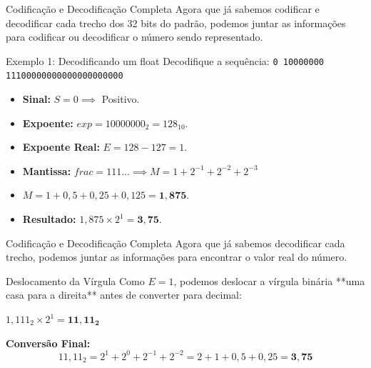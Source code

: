 \begin{frame}{Codificação e Decodificação Completa}
    Agora que já sabemos codificar e decodificar cada trecho dos 32 bits do padrão, podemos juntar as informações para codificar ou decodificar o número sendo representado.

    \begin{exampleblock}{Exemplo 1: Decodificando um float}
        Decodifique a sequência: \texttt{0 10000000 11100000000000000000000}
        \begin{itemize}
            \item \textbf{Sinal:} $S = 0 \implies$ Positivo.
            \item \textbf{Expoente:} $exp = 10000000_2 = 128_{10}$.
            \item \textbf{Expoente Real:} $E = 128 - 127 = 1$.
            \item \textbf{Mantissa:} $frac = 111... \implies M = 1 + 2^{-1} + 2^{-2} + 2^{-3}$
            \item $M = 1 + 0,5 + 0,25 + 0,125 = \mathbf{1,875}$.
            \item \textbf{Resultado:} $1,875 \times 2^1 = \mathbf{3,75}$.
        \end{itemize}
    \end{exampleblock}
\end{frame}


\begin{frame}{Codificação e Decodificação Completa}
    Agora que já sabemos decodificar cada trecho, podemos juntar as informações para encontrar o valor real do número.


    \begin{block}{Deslocamento da Vírgula}
        Como $E=1$, podemos deslocar a vírgula binária **uma casa para a direita** antes de converter para decimal:
        \begin{center}
            $1,111_2 \times 2^1 = \mathbf{11,11_2}$
        \end{center}
        \textbf{Conversão Final:}
        $$11,11_2 = 2^1 + 2^0 + 2^{-1} + 2^{-2} = 2 + 1 + 0,5 + 0,25 = \mathbf{3,75}$$
    \end{block}
\end{frame}


